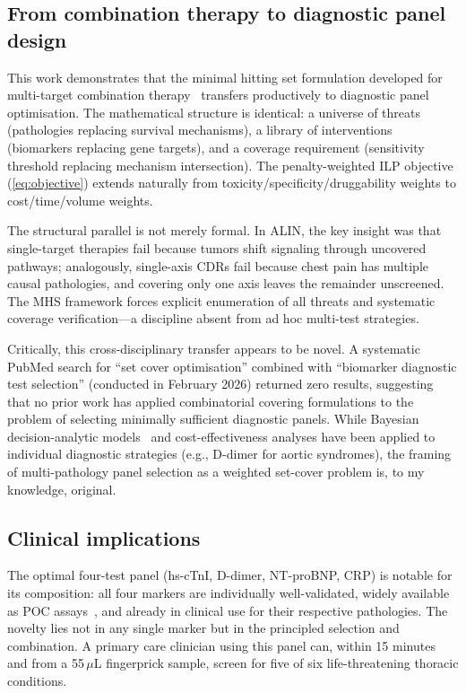 \documentclass[times, twoside, watermark]{zHenriquesLab-StyleBioRxiv}
\begin{document}
\subsection*{From combination therapy to diagnostic panel design}

This work demonstrates that the minimal hitting set formulation developed for multi-target combination therapy~\cite{Erzurumluoglu2026ALIN,VeraLicona2013} transfers productively to diagnostic panel optimisation. The mathematical structure is identical: a universe of threats (pathologies replacing survival mechanisms), a library of interventions (biomarkers replacing gene targets), and a coverage requirement (sensitivity threshold replacing mechanism intersection). The penalty-weighted ILP objective (\cref{eq:objective}) extends naturally from toxicity/specificity/druggability weights to cost/time/volume weights.

The structural parallel is not merely formal. In ALIN, the key insight was that single-target therapies fail because tumors shift signaling through uncovered pathways; analogously, single-axis CDRs fail because chest pain has multiple causal pathologies, and covering only one axis leaves the remainder unscreened. The MHS framework forces explicit enumeration of all threats and systematic coverage verification---a discipline absent from ad hoc multi-test strategies.

Critically, this cross-disciplinary transfer appears to be novel. A systematic PubMed search for ``set cover optimisation'' combined with ``biomarker diagnostic test selection'' (conducted in February 2026) returned zero results, suggesting that no prior work has applied combinatorial covering formulations to the problem of selecting minimally sufficient diagnostic panels. While Bayesian decision-analytic models~\cite{Lord2006,Goodacre2025} and cost-effectiveness analyses have been applied to individual diagnostic strategies (e.g., D-dimer for aortic syndromes), the framing of multi-pathology panel selection as a weighted set-cover problem is, to my knowledge, original.

\subsection*{Clinical implications}

The optimal four-test panel (hs-cTnI, D-dimer, NT-proBNP, CRP) is notable for its composition: all four markers are individually well-validated, widely available as POC assays~\cite{VanDongen2024,Howick2014}, and already in clinical use for their respective pathologies. The novelty lies not in any single marker but in the principled selection and combination. A primary care clinician using this panel can, within 15 minutes and from a 55\,$\mu$L fingerprick sample, screen for five of six life-threatening thoracic conditions.
\end{document}

